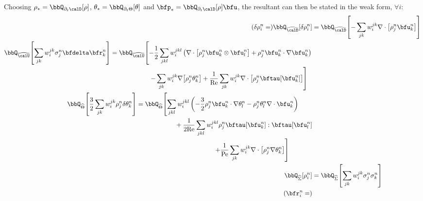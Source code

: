 \begin{example}
        Choosing $\rho_{*} = \bbQ_{\partial_{t}\calD}[\rho]$, $\theta_{*} = \bbQ_{\partial_{t}\Theta}[\theta]$ and $\bfp_{*} = \bbQ_{\partial_{t}\calD}[\rho]\bfu$, the resultant can then be stated in the weak form, $\forall i$:
        \begin{align}
                (\delta\rho_{i}^{n}
                =)
                \bbQ_{\widehat{\calD}}\!\left[\delta\rho_{i}^{n}\right]
                &=
                \bbQ_{\widehat{\calD}}\!\left[- \sum_{jk}w_{i}^{jk}\nabla\cdot\left[\rho_{j}^{n}\bfu_{k}^{n}\right]\right]  \\
            \begin{split}
                \bbQ_{\widehat{\calU}}\!\left[\sum_{jk}w_{i}^{jk}\sigma_{j}^{n}\bfdelta\bfr_{k}^{n}\right]
                &=
                \bbQ_{\widehat{\calU}}\!\left[- \frac{1}{2}\sum_{jkl}w_{i}^{jkl}\left(\nabla\cdot\left[\rho_{j}^{n}\bfu_{k}^{n}\otimes\bfu_{l}^{n}\right] + \rho_{j}^{n}\bfu_{k}^{n}\cdot\nabla\bfu_{k}^{n}\right)\right.  \\
                &\qquad\qquad\qquad\left.- \sum_{jk}w_{i}^{jk}\nabla\!\left[\rho_{j}^{n}\theta_{k}^{n}\right]
                + \frac{1}{\rmRe}\sum_{jk}w_{i}^{jk}\nabla\cdot\left[\rho_{j}^{n}\bftau\!\left[\bfu_{k}^{n}\right]\right]\right]
            \end{split}  \\
            \begin{split}
                \bbQ_{\widehat{\Theta}}\!\left[\frac{3}{2}\sum_{jk}w_{i}^{jk}\rho_{j}^{n}\delta\theta_{k}^{n}\right]
                &=
                \bbQ_{\widehat{\Theta}}\!\left[\sum_{jkl}w_{i}^{jkl}\left(- \frac{3}{2}\rho_{j}^{n}\bfu_{k}^{n}\cdot\nabla\theta_{l}^{n}
                - \rho_{j}^{n}\theta_{l}^{n}\nabla\cdot\bfu_{k}^{n}\right)\right.  \\
                &\qquad\qquad\qquad+ \frac{1}{2\rmRe}\sum_{jkl}w_{i}^{jkl}\rho_{j}^{n}\bftau\!\left[\bfu_{k}^{n}\right]:\bftau\!\left[\bfu_{l}^{n}\right]  \\
                &\qquad\qquad\qquad\qquad\qquad\qquad\left.+ \frac{1}{\rmPe}\sum_{jk}w_{i}^{jk}\nabla\cdot\left[\rho_{j}^{n}\nabla\theta_{k}^{n}\right]\right]
            \end{split}  \\
                \bbQ_{\widehat{\Sigma}}[\rho_{i}^{n}]
                &=
                \bbQ_{\widehat{\Sigma}}\!\left[\sum_{jk}w_{i}^{jk}\sigma_{j}^{n}\sigma_{k}^{n}\right]  \\
                \left(\bfr_{i}^{n}
                =\right)

\end{align}
\end{example}
